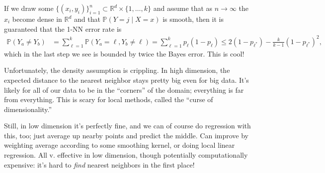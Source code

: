 \documentclass[11pt,letterpaper]{article}
\theoremstyle{definition}
\theoremstyle{plain}
\numberwithin{equation}{section}
\numberwithin{figure}{section}
\begin{document}
If we draw some $\{(x_i,y_i)\}_{i=1}^n \subset \mathbb{R}^d \times \{1,\ldots,k\}$ and assume that as $n \to \infty$ the $x_i$ become dense in $\mathbb{R}^d$ and that $\mathbb{P}(Y=j\mid X=x)$ is smooth, then it is guaranteed that the 1-NN error rate is
%
\begin{align}
	\mathbb{P}(Y_a \neq Y_b) &= \sum_{\ell=1}^k \mathbb{P}(Y_a = \ell, Y_b \neq \ell) = \sum_{\ell=1}^k p_\ell(1-p_\ell) \leq 2 (1-p_{\ell^\ast}) - \frac{k}{k-1} (1-p_{\ell^\ast})^2,
\end{align}
%
which in the last step we see is bounded by twice the Bayes error. This is cool!

Unfortunately, the density assumption is crippling. In high dimension, the expected distance to the nearest neighbor stays pretty big even for big data. It's likely for all of our data to be in the ``corners'' of the domain; everything is far from everything. This is scary for local methods, called the ``curse of dimensionality.''

Still, in low dimension it's perfectly fine, and we can of course do regression with this, too; just average up nearby points and predict the middle. Can improve by weighting average according to some smoothing kernel, or doing local linear regression. All v. effective in low dimension, though potentially computationally expensive: it's hard to \emph{find} nearest neighbors in the first place!
\end{document}
